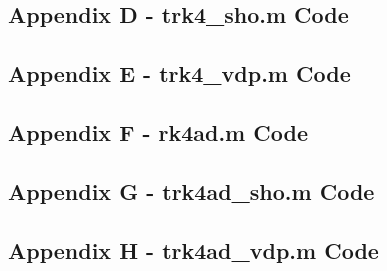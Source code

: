 \documentclass[10pt]{article}
\begin{document}
\subsection*{Appendix D - trk4\_sho.m Code}

\pagebreak

\subsection*{Appendix E - trk4\_vdp.m Code}

\pagebreak

\subsection*{Appendix F - rk4ad.m Code}

\pagebreak

\subsection*{Appendix G - trk4ad\_sho.m Code}

\pagebreak

\subsection*{Appendix H - trk4ad\_vdp.m Code}

\pagebreak
\end{document}
